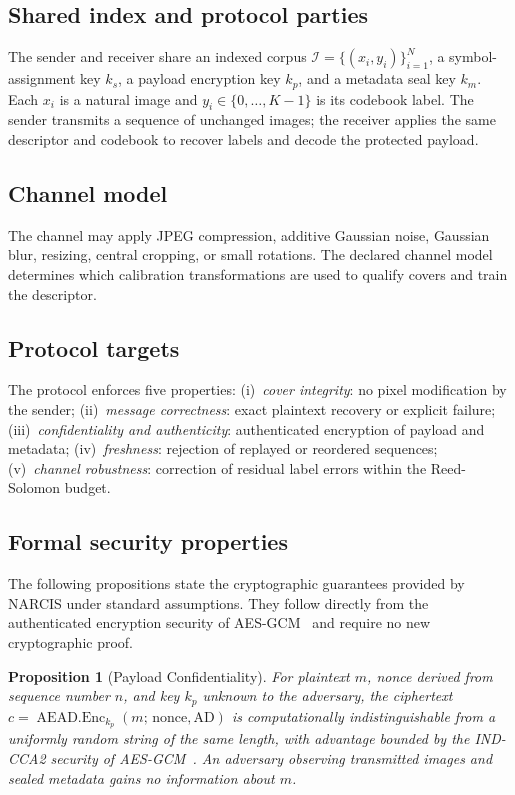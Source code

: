 \documentclass[10pt,journal]{IEEEtran}
\newtheorem{proposition}{Proposition}
\newcommand{\method}{NARCIS\xspace}
\begin{document}
\subsection{Shared index and protocol parties}

The sender and receiver share an indexed corpus
$\mathcal{I}=\{(x_i,y_i)\}_{i=1}^{N}$, a symbol-assignment key $k_s$,
a payload encryption key $k_p$, and a metadata seal key $k_m$. Each
$x_i$ is a natural image and $y_i\in\{0,\ldots,K-1\}$ is its codebook
label. The sender transmits a sequence of unchanged images; the receiver
applies the same descriptor and codebook to recover labels and decode
the protected payload.

\subsection{Channel model}

The channel may apply JPEG compression, additive Gaussian noise,
Gaussian blur, resizing, central cropping, or small rotations. The
declared channel model determines which calibration transformations are
used to qualify covers and train the descriptor.

\subsection{Protocol targets}

The protocol enforces five properties:
(i)~\emph{cover integrity}: no pixel modification by the sender;
(ii)~\emph{message correctness}: exact plaintext recovery or explicit
     failure;
(iii)~\emph{confidentiality and authenticity}: authenticated
     encryption of payload and metadata;
(iv)~\emph{freshness}: rejection of replayed or reordered sequences;
(v)~\emph{channel robustness}: correction of residual label errors
    within the Reed-Solomon budget.

\subsection{Formal security properties}

The following propositions state the cryptographic guarantees
provided by \method under standard assumptions. They follow directly
from the authenticated encryption security of AES-GCM~\cite{nist2007gcm}
and require no new cryptographic proof.

\begin{proposition}[Payload Confidentiality]
\label{prop:conf}
For plaintext $m$, nonce derived from sequence number $n$, and key $k_p$
unknown to the adversary, the ciphertext
$c=\operatorname{AEAD.Enc}_{k_p}(m;\,\mathrm{nonce},\mathrm{AD})$
is computationally indistinguishable from a uniformly random string of
the same length, with advantage bounded by the IND-CCA2 security of
AES-GCM~\cite{nist2007gcm}. An adversary observing transmitted images
and sealed metadata gains no information about $m$.
\end{proposition}
\end{document}
